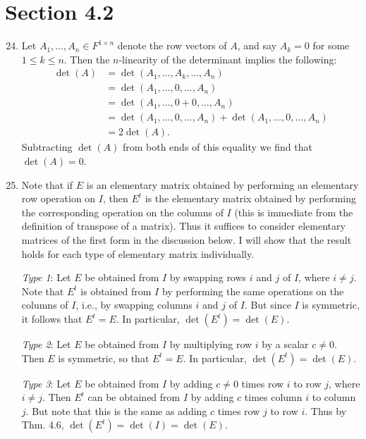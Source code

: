 \documentclass[12pt]{article}
\begin{document}
\section*{Section 4.2}

\begin{enumerate}
\setcounter{enumi}{23}
\item
Let $A_1, \dots, A_n \in F^{1 \times n}$ denote the row vectors of $A$, and say $A_k = 0$ for some $1 \leq k \leq n$. Then the $n$-linearity of the determinant implies the following:
\begin{align*}
\det(A) &= \det(A_1, \dots, A_k, \dots, A_n) \\
&= \det(A_1, \dots, 0, \dots, A_n) \\
&= \det(A_1, \dots, 0 + 0, \dots, A_n) \\
&= \det(A_1, \dots, 0, \dots, A_n) + \det(A_1, \dots, 0, \dots, A_n) \\
&= 2 \det(A).
\end{align*}
Subtracting $\det(A)$ from both ends of this equality we find that $\det(A) = 0$.

\setcounter{enumi}{28}
\item
Note that if $E$ is an elementary matrix obtained by performing an elementary row operation on $I$, then $E^t$ is the elementary matrix obtained by performing the corresponding operation on the columns of $I$ (this is immediate from the definition of transpose of a matrix). Thus it suffices to consider elementary matrices of the first form in the discussion below. I will show that the result holds for each type of elementary matrix individually.

{\it Type 1}: Let $E$ be obtained from $I$ by swapping rows $i$ and $j$ of $I$, where $i \neq j$. Note that $E^t$ is obtained from $I$ by performing the same operations on the columns of $I$, i.e., by swapping columns $i$ and $j$ of $I$. But since $I$ is symmetric, it follows that $E^t = E$. In particular, $\det(E^t) = \det(E)$.

{\it Type 2}: Let $E$ be obtained from $I$ by multiplying row $i$ by a scalar $c \neq 0$. Then $E$ is symmetric, so that $E^t = E$. In particular, $\det(E^t) = \det(E)$.

{\it Type 3}: Let $E$ be obtained from $I$ by adding $c \neq 0$ times row $i$ to row $j$, where $i \neq j$. Then $E^t$ can be obtained from $I$ by adding $c$ times column $i$ to column $j$. But note that this is the same as adding $c$ times row $j$ to row $i$. Thus by Thm. 4.6, $\det(E^t) = \det(I) = \det(E)$.

\end{enumerate}
\end{document}
